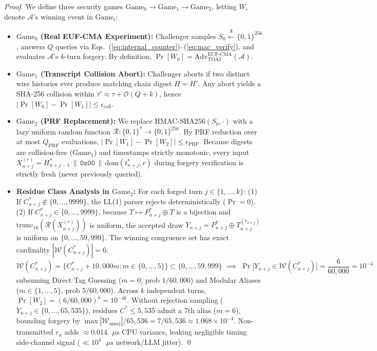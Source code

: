 \documentclass[9pt,a4paper]{extarticle}
\begin{document}
\emph{Proof.} We define three security games $\text{Game}_0 \rightarrow \text{Game}_1 \rightarrow \text{Game}_2$, letting $W_i$ denote $\mathcal{A}$'s winning event in $\text{Game}_i$:
\begin{itemize}
  \item \textbf{$\text{Game}_0$ (Real EUF-CMA Experiment):} Challenger samples $S_0 \stackrel{\$}{\leftarrow} \{0,1\}^{256}$, answers $Q$ queries via Eqs.\ (\ref{eq:internal_counter})--(\ref{eq:mac_verify}), and evaluates $\mathcal{A}$'s $k$-turn forgery. By definition, $\Pr[W_0] = \text{Adv}_{\text{TOAI}}^{\text{EUF-CMA}}(\mathcal{A})$.
  \item \textbf{$\text{Game}_1$ (Transcript Collision Abort):} Challenger aborts if two distinct wire histories ever produce matching chain digest $H = H'$. Any abort yields a SHA-256 collision within $\tau' \approx \tau + \mathcal{O}(Q+k)$, hence $|\Pr[W_0] - \Pr[W_1]| \le \epsilon_{\text{coll}}$.
  \item \textbf{$\text{Game}_2$ (PRF Replacement):} We replace $\text{HMAC-SHA256}(S_0, \cdot)$ with a lazy uniform random function $\mathcal{R}: \{0,1\}^* \rightarrow \{0,1\}^{256}$. By PRF reduction over at most $Q_{\text{PRF}}$ evaluations, $|\Pr[W_1] - \Pr[W_2]| \le \epsilon_{\text{PRF}}$. Because digests are collision-free ($\text{Game}_1$) and timestamps strictly monotonic, every input $X_{n+j}^{(r)} = H_{n+j-1}^* \,\|\, \texttt{0x00} \,\|\, \text{dom}(t_{n+j}^*, r)$ during forgery verification is strictly fresh (never previously queried).
  \item \textbf{Residue Class Analysis in $\text{Game}_2$:} For each forged turn $j \in \{1, \dots, k\}$: (1) If $C_{n+j}^* \notin \{0, \dots, 9999\}$, the LL(1) parser rejects deterministically ($\Pr = 0$). (2) If $C_{n+j}^* \in \{0, \dots, 9999\}$, because $T \mapsto P_{n+j}^* \oplus T$ is a bijection and $\text{trunc}_{16}(\mathcal{R}(X_{n+j}^{(r)}))$ is uniform, the accepted draw $Y_{n+j} = P_{n+j}^* \oplus T_{n+j}^{(r_{n+j})}$ is uniform on $\{0, \dots, 59{,}999\}$. The winning congruence set has exact cardinality $|\mathcal{W}(C_{n+j}^*)| = 6$:
  \begin{equation}
    \mathcal{W}(C_{n+j}^*) = \bigl\{ C_{n+j}^* + 10{,}000m : m \in \{0,\dots,5\} \bigr\} \subset \{0,\dots,59{,}999\}
    \;\implies\; \Pr\bigl[Y_{n+j} \in \mathcal{W}(C_{n+j}^*)\bigr] = \frac{6}{60{,}000} = 10^{-4}
    \label{eq:congruence_set}
  \end{equation}
  subsuming Direct Tag Guessing ($m=0$, prob $1/60{,}000$) and Modular Aliases ($m \in \{1,\dots,5\}$, prob $5/60{,}000$). Across $k$ independent turns, $\Pr[W_2] = (6/60{,}000)^k = 10^{-4k}$. Without rejection sampling ($Y_{n+j} \in \{0,\dots,65{,}535\}$), residues $C^* \le 5{,}535$ admit a 7th alias ($m=6$), bounding forgery by $\max |\mathcal{W}_{\text{unrej}}|/65{,}536 = 7/65{,}536 \approx 1.068 \times 10^{-4}$. Non-transmitted $r_n$ adds $\approx 0.014\text{ }\mu\text{s}$ CPU variance, leaking negligible timing side-channel signal ($ \ll 10^4\text{ }\mu\text{s}$ network/LLM jitter). \qed
\end{itemize}
\end{document}
